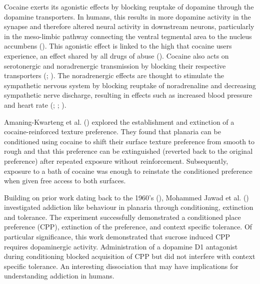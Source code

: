 \documentclass[
  jou,
  floatsintext,
  longtable,
  nolmodern,
  notxfonts,
  notimes,
  donotrepeattitle,
  colorlinks=true,linkcolor=blue,citecolor=blue,urlcolor=blue]{apa7}
\begin{document}
Cocaine exerts its agonistic effects by blocking reuptake of dopamine
through the dopamine transporters. In humans, this results in more
dopamine activity in the synapse and therefore altered neural activity
in downstream neurons, particularly in the meso-limbic pathway
connecting the ventral tegmental area to the nucleus accumbens
(). This
agonistic effect is linked to the high that cocaine users experience, an
effect shared by all drugs of abuse
().
Cocaine also acts on serotonergic and noradrenergic transmission by
blocking their respective transporters
(;
). The noradrenergic
effects are thought to stimulate the sympathetic nervous system by
blocking reuptake of noradrenaline and decreasing sympathetic nerve
discharge, resulting in effects such as increased blood pressure and
heart rate (;
;
).

Amaning-Kwarteng et al.
() explored the
establishment and extinction of a cocaine-reinforced texture preference.
They found that planaria can be conditioned using cocaine to shift their
surface texture preference from smooth to rough and that this preference
can be extinguished (reverted back to the original preference) after
repeated exposure without reinforcement. Subsequently, exposure to a
bath of cocaine was enough to reinstate the conditioned preference when
given free access to both surfaces.

Building on prior work dating back to the 1960's
(), Mohammed
Jawad et al. ()
investigated addiction like behaviour in planaria through conditioning,
extinction and tolerance. The experiment successfully demonstrated a
conditioned place preference (CPP), extinction of the preference, and
context specific tolerance. Of particular significance, this work
demonstrated that sucrose induced CPP requires dopaminergic activity.
Administration of a dopamine D1 antagonist during conditioning blocked
acquisition of CPP but did not interfere with context specific
tolerance. An interesting dissociation that may have implications for
understanding addiction in humans.
\end{document}
